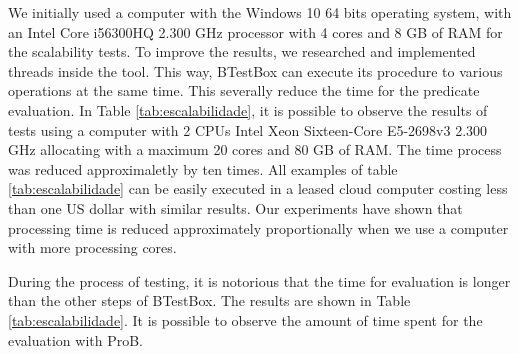 \documentclass[runningheads]{llncs}
\begin{document}
We initially used a computer with the Windows 10 64 bits operating system, with an Intel Core i56300HQ 2.300 GHz processor with 4 cores and 8 GB of RAM for the scalability tests. %
%
To improve the results, we researched and implemented threads inside the tool.
This way, BTestBox can execute its procedure to various operations at the same time.
This severally reduce the time for the predicate evaluation. In Table \ref{tab:escalabilidade}, it is possible to observe the results of tests using a computer with 2 CPUs Intel Xeon Sixteen-Core E5-2698v3 2.300 GHz allocating with a maximum 20 cores and 80 GB of RAM. The time process was reduced approximaletly by ten times.
All examples of table \ref{tab:escalabilidade} can be easily executed in a leased cloud computer costing less than one US dollar with similar results.
Our experiments have shown that processing time is reduced approximately proportionally when we use a computer with more processing cores.


During the process of testing, it is notorious that the time for evaluation is longer than the other steps of BTestBox. The results are shown in Table \ref{tab:escalabilidade}. It is possible to observe the amount of time spent for the evaluation with ProB.
\end{document}

